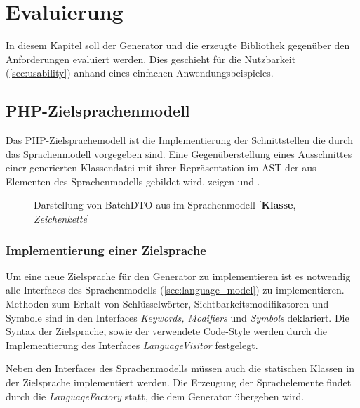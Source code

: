\chapter{Evaluierung}
\label{chap:evaluation}


In diesem Kapitel soll der Generator und die erzeugte Bibliothek gegenüber den Anforderungen evaluiert werden. Dies geschieht für die Nutzbarkeit (\cref{sec:usability}) anhand eines einfachen Anwendungsbeispieles.

\section{PHP-Zielsprachenmodell}
\label{sec:php_target_language_model}

Das PHP-Zielsprachemodell ist die Implementierung der Schnittstellen die durch das Sprachenmodell vorgegeben sind.
Eine Gegenüberstellung eines Ausschnittes einer generierten Klassendatei mit ihrer Repräsentation im \gls{AST} der aus Elementen des Sprachenmodells gebildet wird, zeigen  und .

\begin{sidewaysfigure}
    \centering
    \resizebox{\textwidth}{!}{
      
    }
    \caption{Darstellung von BatchDTO aus  im Sprachenmodell [\textbf{Klasse}, \emph{Zeichenkette}]}
    \label{fig:modelRepresentationOfBatchDTO}
\end{sidewaysfigure}

\subsection{Implementierung einer Zielsprache}
\label{sec:target_language_implementation}

Um eine neue Zielsprache für den Generator zu implementieren ist es notwendig alle Interfaces des Sprachenmodells (\cref{sec:language_model}) zu implementieren. Methoden zum Erhalt von Schlüsselwörter, Sichtbarkeitsmodifikatoren und Symbole sind in den Interfaces \emph{Keywords, Modifiers} und \emph{Symbols} deklariert. Die Syntax der Zielsprache, sowie der verwendete Code-Style werden durch die Implementierung des Interfaces \emph{LanguageVisitor} festgelegt.

Neben den Interfaces des Sprachenmodells müssen auch die statischen Klassen in der Zielsprache implementiert werden. Die Erzeugung der Sprachelemente findet durch die \emph{LanguageFactory} statt, die dem Generator übergeben wird.


